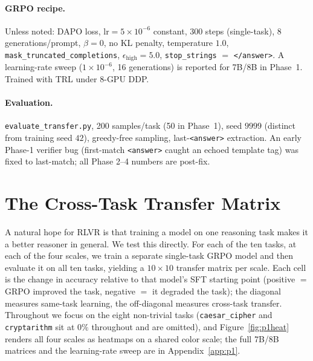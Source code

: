 \documentclass{article}
\begin{document}
\paragraph{GRPO recipe.} Unless noted: DAPO loss, $\mathrm{lr}{=}5\!\times\!10^{-6}$ constant,
300 steps (single-task), 8 generations/prompt, $\beta{=}0$, no KL penalty, temperature $1.0$,
\texttt{mask\_truncated\_completions}, $\epsilon_{\mathrm{high}}{=}5.0$, \texttt{stop\_strings}
$=$ \texttt{</answer>}. A learning-rate sweep ($1\!\times\!10^{-6}$, 16 generations) is reported
for 7B/8B in Phase~1. Trained with TRL \citep{trl} under 8-GPU DDP.

\paragraph{Evaluation.} \texttt{evaluate\_transfer.py}, 200 samples/task (50 in Phase~1),
seed $9999$ (distinct from training seed $42$), greedy-free sampling, last-\texttt{<answer>}
extraction. An early Phase-1 verifier bug (first-match \texttt{<answer>} caught an echoed
template tag) was fixed to last-match; all Phase 2--4 numbers are post-fix.

\section{The Cross-Task Transfer Matrix}
\label{sec:phase1}
A natural hope for RLVR is that training a model on one reasoning task makes it a better reasoner
in general. We test this directly. For each of the ten tasks, at each of the four scales, we train
a separate single-task GRPO model and then evaluate it on all ten tasks, yielding a $10\times10$
transfer matrix per scale. Each cell is the change in accuracy relative to that model's SFT
starting point (positive $=$ GRPO improved the task, negative $=$ it degraded the task); the
diagonal measures same-task learning, the off-diagonal measures cross-task transfer.
Throughout we focus on the eight non-trivial tasks
(\texttt{caesar\_cipher} and \texttt{cryptarithm} sit at $0\%$ throughout and are omitted), and
Figure~\ref{fig:p1heat} renders all four scales as heatmaps on a shared color scale; the full 7B/8B
matrices and the learning-rate sweep are in Appendix~\ref{app:p1}.
\end{document}
